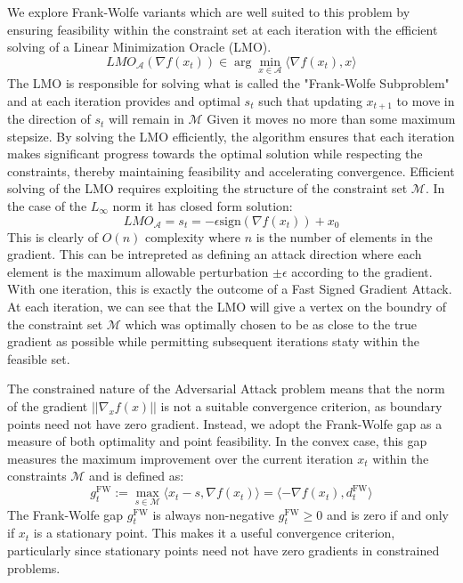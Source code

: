 \documentclass{article}
\begin{document}
We explore Frank-Wolfe variants which are well suited to this problem by ensuring feasibility within the constraint set at each iteration with the efficient solving of a Linear Minimization Oracle (LMO). 
$$
LMO_\mathcal{A}(\nabla f(x_t)) \in \arg \min_{x \in \mathcal{A}} \langle \nabla f(x_t), x\rangle
$$
The LMO is responsible for solving what is called the "Frank-Wolfe Subproblem" and at each iteration provides and optimal $s_t$ such that updating $x_{t+1}$ to move in the direction of $s_t$ will remain in $\mathcal{M}$ Given it moves no more than some maximum stepsize. By solving the LMO efficiently, the algorithm ensures that each iteration makes significant progress towards the optimal solution while respecting the constraints, thereby maintaining feasibility and accelerating convergence. 
Efficient solving of the LMO requires exploiting the structure of the constraint set $\mathcal{M}$. In the case of the $L_\infty$ norm it has closed form solution:
$$LMO_\mathcal{A} = s_t = -\epsilon \text{sign}(\nabla f(x_t)) + x_0$$
This is clearly of $O(n)$ complexity where $n$ is the number of elements in the gradient. This can be intrepreted as defining an attack direction where each element is the maximum allowable perturbation $\pm \epsilon$ according to the gradient. With one iteration, this is exactly the outcome of a Fast Signed Gradient Attack. At each iteration, we can see that the LMO will give a vertex on the boundry of the constraint set $\mathcal{M}$ which was optimally chosen to be as close to the true gradient as possible while permitting subsequent iterations staty within the feasible set.


The constrained nature of the Adversarial Attack problem means that the norm of the gradient $||\nabla_x f(x)||$ is not a suitable convergence criterion, as boundary points need not have zero gradient. Instead, we adopt the Frank-Wolfe gap as a measure of both optimality and point feasibility. In the convex case, this gap measures the maximum improvement over the current iteration $x_t$ within the constraints $\mathcal{M}$ and is defined as:
$$g_t^{\text{FW}} := \max_{s \in \mathcal{M}} \langle x_t - s, \nabla f(x_t) \rangle = \langle -\nabla f(x_t), d_t^{\text{FW}} \rangle$$
The Frank-Wolfe gap $g_t^{\text{FW}}$ is always non-negative $g_t^{\text{FW}} \geq 0$ and is zero if and only if $x_t$ is a stationary point. This makes it a useful convergence criterion, particularly since stationary points need not have zero gradients in constrained problems.
\end{document}
